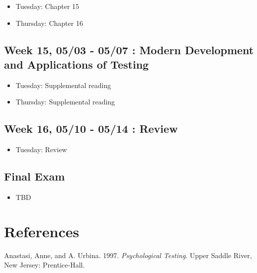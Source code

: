 \documentclass[11pt,]{article}
\providecommand{\tightlist}{%
  \setlength{\itemsep}{0pt}\setlength{\parskip}{0pt}}
\begin{document}
\begin{itemize}
\tightlist
\item
  Tuesday: Chapter 15
\item
  Thursday: Chapter 16
\end{itemize}

\hypertarget{week-15-0503---0507-modern-development-and-applications-of-testing}{%
\subsection{Week 15, 05/03 - 05/07 : Modern Development and Applications
of
Testing}\label{week-15-0503---0507-modern-development-and-applications-of-testing}}

\begin{itemize}
\tightlist
\item
  Tuesday: Supplemental reading
\item
  Thursday: Supplemental reading
\end{itemize}

\hypertarget{week-16-0510---0514-review}{%
\subsection{Week 16, 05/10 - 05/14 :
Review}\label{week-16-0510---0514-review}}

\begin{itemize}
\tightlist
\item
  Tuesday: Review
\end{itemize}

\hypertarget{final-exam}{%
\subsection{Final Exam}\label{final-exam}}

\begin{itemize}
\tightlist
\item
  TBD
\end{itemize}

\hypertarget{references}{%
\section*{References}\label{references}}

\hypertarget{refs}{}
\leavevmode\hypertarget{ref-anastasi1997}{}%
Anastasi, Anne, and A. Urbina. 1997. \emph{Psychological Testing}. Upper
Saddle River, New Jersey: Prentice-Hall.
\end{document}
